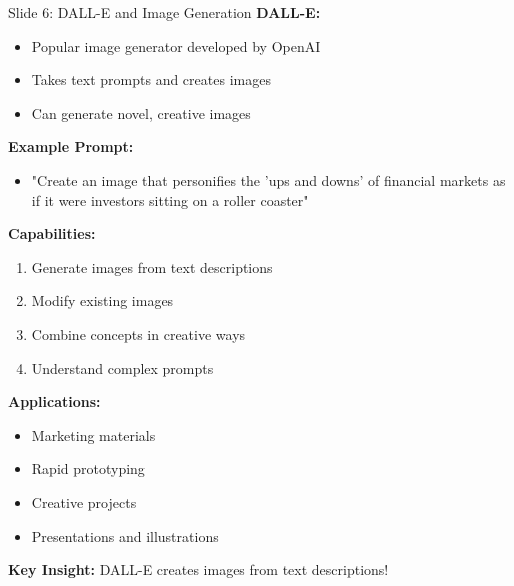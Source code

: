 \documentclass[8pt]{beamer}
\begin{document}
	\begin{frame}{Slide 6: DALL-E and Image Generation}
		\fontsize{6.5}{7.5}\selectfont
		\textbf{DALL-E:}
		\begin{itemize}
			\item Popular image generator developed by OpenAI
			\item Takes text prompts and creates images
			\item Can generate novel, creative images
		\end{itemize}
		
		\vspace{0.1cm}
		\textbf{Example Prompt:}
		\begin{itemize}
			\item "Create an image that personifies the 'ups and downs' of financial markets as if it were investors sitting on a roller coaster"
		\end{itemize}
		
		\vspace{0.1cm}
		\textbf{Capabilities:}
		\begin{enumerate}
			\item Generate images from text descriptions
			\item Modify existing images
			\item Combine concepts in creative ways
			\item Understand complex prompts
		\end{enumerate}
		
		\vspace{0.1cm}
		\textbf{Applications:}
		\begin{itemize}
			\item Marketing materials
			\item Rapid prototyping
			\item Creative projects
			\item Presentations and illustrations
		\end{itemize}
		
		\textcolor{myblue}{\textbf{Key Insight:}} DALL-E creates images from text descriptions!
	\end{frame}
	
\end{document}
